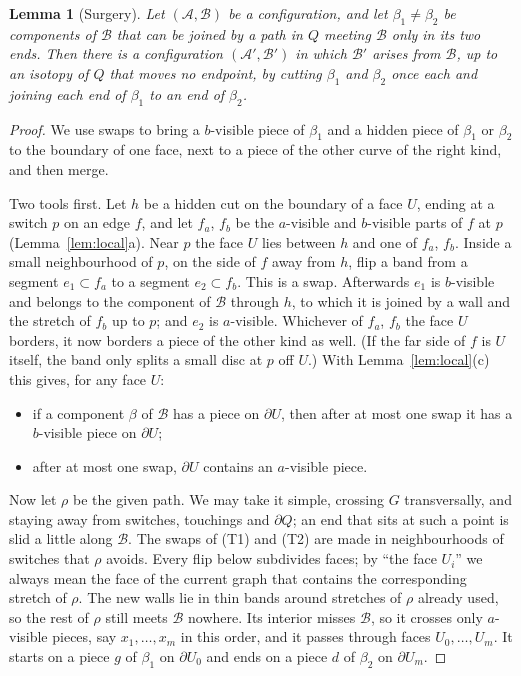 \documentclass[11pt,a4paper]{article}
\newtheorem{lemma}[theorem]{Lemma}
\theoremstyle{definition}
\theoremstyle{remark}
\newcommand{\A}{\mathcal{A}}
\newcommand{\B}{\mathcal{B}}
\newcommand{\bd}{\partial}
\begin{document}
\begin{lemma}[Surgery]\label{lem:surgery}
Let $(\A,\B)$ be a configuration, and let $\beta_1\ne\beta_2$ be components
of $\B$ that can be joined by a path in $Q$ meeting $\B$ only in its two
ends. Then there is a configuration $(\A',\B')$ in which $\B'$ arises from
$\B$, up to an isotopy of $Q$ that moves no endpoint, by cutting $\beta_1$
and $\beta_2$ once each and joining each end of $\beta_1$ to an end of
$\beta_2$.
\end{lemma}
\begin{proof}
We use swaps to bring a $b$-visible piece of $\beta_1$ and a hidden piece of
$\beta_1$ or $\beta_2$ to the boundary of one face, next to a piece of the
other curve of the right kind, and then merge.

Two tools first. Let $h$ be a hidden cut on the boundary of a face $U$,
ending at a switch $p$ on an edge $f$, and let $f_a$, $f_b$ be the
$a$-visible and $b$-visible parts of $f$ at $p$ (Lemma~\ref{lem:local}a).
Near $p$ the face $U$ lies between $h$ and one of $f_a$, $f_b$. Inside a
small neighbourhood of $p$, on the side of $f$ away from $h$, flip a band
from a segment $e_1\subset f_a$ to a segment $e_2\subset f_b$. This is a
swap. Afterwards $e_1$ is $b$-visible and belongs to the component of $\B$
through $h$, to which it is joined by a wall and the stretch of $f_b$ up to
$p$; and $e_2$ is $a$-visible. Whichever of $f_a$, $f_b$ the face $U$
borders, it now borders a piece of the other kind as well. (If the far
side of $f$ is $U$ itself, the band only splits a small disc at $p$ off
$U$.) With Lemma~\ref{lem:local}(c) this gives, for any face $U$:
\begin{itemize}
\item[(T1)] if a component $\beta$ of $\B$ has a piece on $\bd U$, then
  after at most one swap it has a $b$-visible piece on $\bd U$;
\item[(T2)] after at most one swap, $\bd U$ contains an $a$-visible piece.
\end{itemize}

Now let $\rho$ be the given path. We may take it simple, crossing $G$
transversally, and staying away from switches, touchings and $\bd Q$; an
end that sits at such a point is slid a little along $\B$. The swaps of
(T1) and (T2) are made in neighbourhoods of switches that $\rho$ avoids.
Every flip below subdivides faces; by ``the face $U_i$'' we always mean the
face of the current graph that contains the corresponding stretch of
$\rho$. The new walls lie in thin bands around stretches of $\rho$
already used, so the rest of $\rho$ still meets $\B$ nowhere. Its interior misses $\B$, so it crosses
only $a$-visible pieces, say $x_1,\dots,x_m$ in this order, and it passes
through faces $U_0,\dots,U_m$. It starts on a piece $g$ of $\beta_1$ on
$\bd U_0$ and ends on a piece $d$ of $\beta_2$ on $\bd U_m$.


\end{proof}
\end{document}
